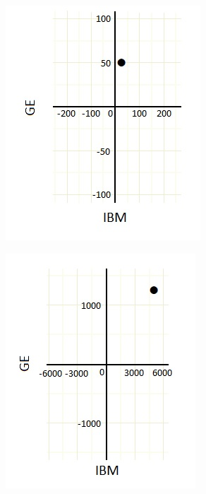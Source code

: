 \documentclass{article}\usepackage{graphicx, color}
\begin{document}
\begin{figure}[H]
  \begin{subfigure}[b]{0.5\textwidth}
      \centering
      \includegraphics[width=\textwidth]{sharespace}
      \label{fig:sharespace}
  \end{subfigure}
  \begin{subfigure}[b]{0.5\textwidth}
      \centering
      \includegraphics[width=\textwidth]{dollarspace}

\end{subfigure}
\end{figure}
\end{document}

